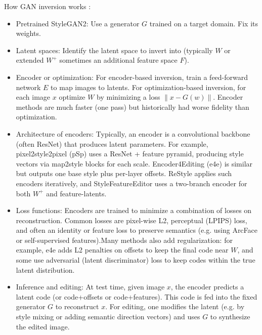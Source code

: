 How GAN inversion works \citep{richardson2021encodingstylestyleganencoder,alaluf2021restyleresidualbasedstyleganencoder,tov2021designingencoderstyleganimage}:
\begin{itemize}
    \item Pretrained StyleGAN2: Use a generator $G$ trained on a target domain. Fix its weights.
    \item Latent spaces: Identify the latent space to invert into (typically $W$ or extended $W^+$ sometimes an additional feature space $F$).
    \item Encoder or optimization: For encoder-based inversion, train a feed-for\-ward network $E$ to map images to latents. For optimization-based inversion, for each image $x$ optimize $W$ by minimizing a loss $\|x-G(w)\|$. Encoder methods are much faster (one pass) but historically had worse fidelity than optimization.
    \item Architecture of encoders: Typically, an encoder is a convolutional backbone (often ResNet) that produces latent parameters.
    For example, pixel2\-style2pixel (pSp) uses a ResNet + feature pyramid, producing style vectors via map2style blocks for each scale.
    Encoder4Editing (e4e) is similar but outputs one base style plus per-layer offsets.
    ReStyle applies such encoders iteratively, and StyleFeatureEditor uses a two-branch encoder for both $W^+$ and feature-latents.
    \item Loss functions: Encoders are trained to minimize a combination of losses on reconstruction. Common losses are pixel-wise L2, perceptual (LPIPS) loss, and often an identity or feature loss to preserve semantics (e.g. using ArcFace or self-supervised features).Many methods also add regularization: for example, e4e adds L2 penalties on offsets to keep the final code near $W$, and some use adversarial (latent discriminator) loss to keep codes within the true latent distribution.
    \item Inference and editing: At test time, given image $x$,  the encoder predicts a latent code (or code+offsets or code+features). This code is fed into the fixed generator $G$  to reconstruct $x$.  For editing, one modifies the latent (e.g. by style mixing or adding semantic direction vectors) and uses $G$ to synthesize the edited image.
\end{itemize}

